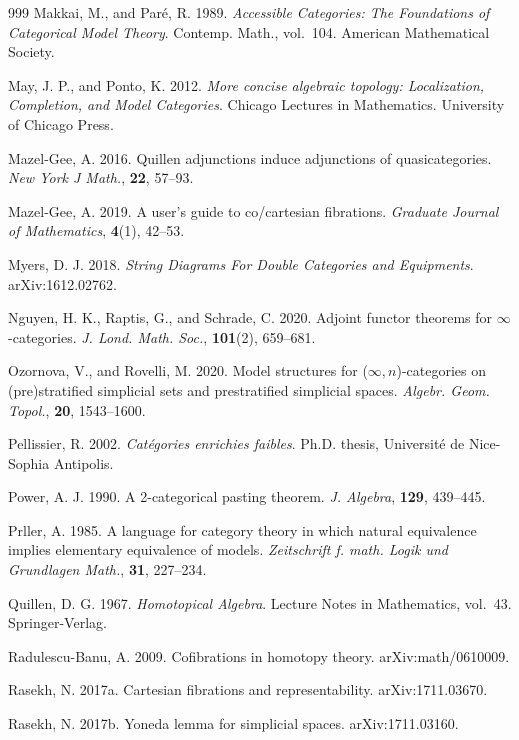 \begin{thebibliography}{999}
 Makkai, M., and Paré, R. 1989. \emph{Accessible Categories: The
  Foundations of Categorical Model Theory}. Contemp. Math., vol.~104.
  American Mathematical Society.

 May, J. P., and Ponto, K. 2012. \emph{More concise algebraic
  topology: Localization, Completion, and Model Categories}. Chicago Lectures
  in Mathematics. University of Chicago Press.

 Mazel-Gee, A. 2016. Quillen adjunctions induce adjunctions of
  quasicategories. \emph{New York J Math.}, \textbf{22}, 57--93.

 Mazel-Gee, A. 2019. A user's guide to co/cartesian fibrations.
  \emph{Graduate Journal of Mathematics}, \textbf{4}(1), 42--53.

 Myers, D. J. 2018. \emph{String Diagrams For Double Categories
  and Equipments}. arXiv:1612.02762.

 Nguyen, H. K., Raptis, G., and Schrade, C. 2020. Adjoint functor
  theorems for $\infty$-categories. \emph{J. Lond. Math. Soc.},
  \textbf{101}(2), 659--681.

 Ozornova, V., and Rovelli, M. 2020. Model structures for
  ($\infty,n$)-categories on (pre)stratified simplicial sets and prestratified
  simplicial spaces. \emph{Algebr. Geom. Topol.}, \textbf{20}, 1543--1600.

 Pellissier, R. 2002. \emph{Catégories enrichies faibles}. Ph.D.
  thesis, Université de Nice-Sophia Antipolis.

 Power, A. J. 1990. A 2-categorical pasting theorem. \emph{J.
  Algebra}, \textbf{129}, 439--445.

 Prller, A. 1985. A language for category theory in which natural
  equivalence implies elementary equivalence of models. \emph{Zeitschrift f.
  math. Logik und Grundlagen Math.}, \textbf{31}, 227--234.

 Quillen, D. G. 1967. \emph{Homotopical Algebra}. Lecture Notes in
  Mathematics, vol.~43. Springer-Verlag.

 Radulescu-Banu, A. 2009. Cofibrations in homotopy theory.
  arXiv:math/0610009.

 Rasekh, N. 2017a. Cartesian fibrations and representability.
  arXiv:1711.03670.

 Rasekh, N. 2017b. Yoneda lemma for simplicial spaces.
  arXiv:1711.03160.


\end{thebibliography}
